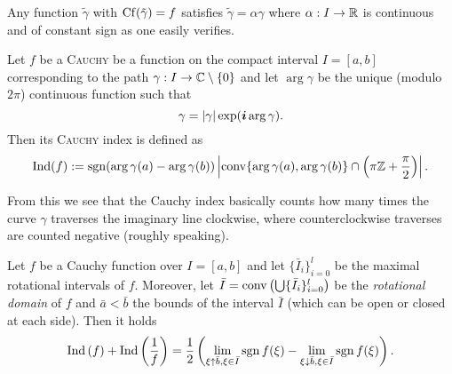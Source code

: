 \message{ !name(On The Routh-Hurwitz Theorem.tex)}\documentclass[10pt,a4paper]{article}
\begin{document}
\begin{remark}
Any function $\tilde{\gamma}$ with $\operatorname{Cf}(\tilde{\gamma})=f$ satisfies $\tilde{\gamma}=\alpha\gamma$ where $\alpha:I\rightarrow\mathbb{R}$ is continuous and of constant sign as one easily verifies. 
\end{remark}

\begin{definition} Let $f$ be a \textsc{Cauchy} be a function on the compact interval $I=[a,b]$ corresponding to the path $\gamma:I\rightarrow\mathbb{C}\setminus\{0\}$ and let $\arg{\gamma}$ be the unique (modulo $2\pi$) continuous function such that 
\begin{equation}
\gamma = \left|\gamma\right|\exp(\boldsymbol{i}\arg{\gamma})\text{.}
\end{equation}
Then its \textsc{Cauchy} index is defined as
\begin{equation}
\operatorname{Ind}(f):=\operatorname{sgn}(\arg{\gamma(a)}-\arg{\gamma(b)})\left|\operatorname{conv}\{\arg{\gamma(a)},\arg{\gamma(b)}\}\cap\left(\pi\mathbb{Z}+\frac{\pi}{2}\right)\right|\text{.}
\end{equation}
\end{definition}

\begin{remark} From this we see that the Cauchy index basically counts how many times the curve $\gamma$ traverses the imaginary line clockwise, where counterclockwise traverses are counted negative (roughly speaking). 
\end{remark} %

\begin{lemma} Let $f$ be a Cauchy function over $I=[a,b]$ and let $\{\bar{I}_i\}_{i=0}^l$ be the maximal rotational intervals of $f$. Moreover, let $\bar{I}=\operatorname{conv}\left(\bigcup\{\bar{I}_i\}_{i=0}^l\right)$ be the \emph{rotational domain} of $f$ and $\bar{a}<\bar{b}$ the bounds of the interval $\bar{I}$ (which can be open or closed at each side).  
Then it holds
\begin{equation}
\operatorname{Ind}\left(f\right)+\operatorname{Ind}\left(\frac{1}{f}\right)=\frac{1}{2}\left(\lim_{\xi\uparrow\bar{b},\xi\in\bar{I}}{\operatorname{sgn}{f(\xi)}}-\lim_{\xi\downarrow\bar{b},\xi\in\bar{I}}{\operatorname{sgn}{f(\xi)}}\right)\text{.}
\end{equation}
\end{lemma}
\end{document}
